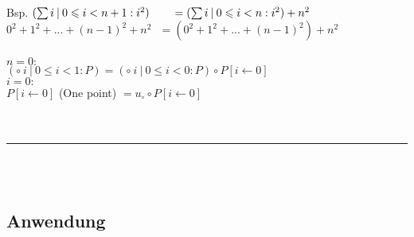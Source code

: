 \documentclass[18pt,a4paper]{article}
\newcommand{\tab}{\hspace*{2em}}
\begin{document}
\\
Bsp. $(\sum{i} \:\vert\: 0\leqslant i < n+1 : i^2) \tab = (\sum{i} \:\vert\: 0\leqslant i < n : i^2) + n^2$\\
\tab $0^2 + 1^2 + ... + (n-1)^2 + n^2 \:\:\:= (0^2 + 1^2 + ... + (n-1)^2) + n^2$\\
\\
$n=0 :$\\
\tab $(\circ \:i \:\vert\: 0\leqslant i < 1 : P) = (\circ \:i \:\vert\: 0\leqslant i < 0 : P) \circ P[i\leftarrow 0]$\\
\tab $i=0 :$\\
\tab \tab $P[i\leftarrow 0]$ (One point) $= u_\circ \circ P[i\leftarrow 0]$\\
\\
\\
\rule{\textwidth}{0.4mm}\\
\\

\subsection{Anwendung}
\end{document}
